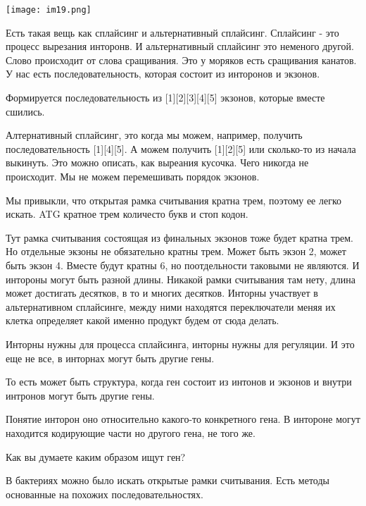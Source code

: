 \texttt{[image: im19.png]}

Есть такая вещь как сплайсинг и альтернативный сплайсинг. 
Сплайсинг - это процесс вырезания инторонв. И альтернативный 
сплайсинг это неменого другой. Слово происходит от слова сращивания. 
Это у моряков есть сращивания канатов. У нас есть последовательность, 
которая состоит из инторонов и экзонов. 

Формируется последовательность из [1][2][3][4][5] экзонов, которые вместе сшились. 

Алтернативный сплайсинг, это когда мы можем, например, получить 
последовательность [1][4][5]. А можем 
получить [1][2][5] или сколько-то из начала выкинуть. Это 
можно описать, как выреания кусочка. Чего никогда не происходит. 
Мы не можем перемешивать порядок экзонов. 

Мы привыкли, что открытая рамка считывания кратна трем, поэтому ее легко искать. 
ATG кратное трем количесто букв и стоп кодон. 

Тут рамка считывания состоящая из финальных экзонов тоже будет 
кратна трем. Но отдельные экзоны не обязательно кратны трем. 
Может быть экзон 2, может быть экзон 4. Вместе будут 
кратны 6, но поотдельности таковыми не являются. И 
интороны могут быть разной длины. Никакой рамки считывания 
там нету, длина может достигать десятков, в то и многих десятков. 
Инторны участвует в альтернативном сплайсинге, между ними 
находятся переключатели меняя их клетка определяет 
какой именно продукт будем от сюда делать. 

Инторны нужны для процесса сплайсинга, инторны нужны для регуляции. 
И это еще не все, в инторнах могут быть другие гены. 

То есть может быть структура, когда ген состоит из интонов и экзонов и внутри интронов 
могут быть другие гены. 

Понятие инторон оно относительно какого-то конкретного гена. В интороне 
могут находится кодирующие части но другого гена, не того же. 

Как вы думаете каким образом ищут ген? 

В бактериях можно было искать открытые рамки считывания. Есть 
методы основанные на похожих последовательностях. 

